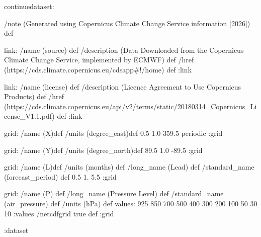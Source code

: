 \begin{ingrid}
continuedataset:

/note (Generated using Copernicus Climate Change Service information [2026]) def

link:
/name (source) def
/description (Data Downloaded from the Copernicus Climate Change Service, implemented by ECMWF) def
/href (https://cds.climate.copernicus.eu/cdsapp#!/home) def
:link

link:
/name (license) def
/description (Licence Agreement to Use Copernicus Products) def
/href (https://cds.climate.copernicus.eu/api/v2/terms/static/20180314_Copernicus_License_V1.1.pdf) def
:link

grid:
/name (X)def
/units (degree_east)def
 0.5 1.0 359.5
periodic
:grid 

grid:
/name (Y)def
/units (degree_north)def
89.5 1.0  -89.5
:grid

grid:
/name (L)def
/units (months) def
/long_name (Lead) def
/standard_name (forecast_period) def
0.5 1. 5.5
:grid

grid:
/name (P) def
/long_name (Pressure Level) def
/standard_name (air_pressure) def
/units (hPa) def
values: 925 850 700 500 400 300 200 100 50 30 10 :values
/netcdfgrid true def
:grid


:dataset


\end{ingrid}
